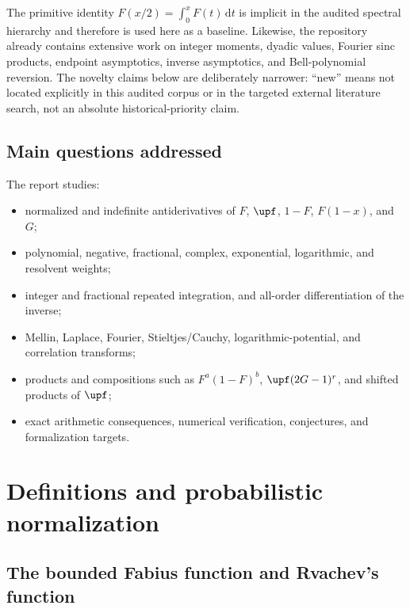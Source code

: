\documentclass[11pt,oneside]{article}
\theoremstyle{definition}
\theoremstyle{remark}
\newcommand{\dd}{\,\mathrm d}
\newcommand{\1}{\mathbf 1}
\begin{document}
The primitive identity $F(x/2)=\int_0^xF(t)\dd t$ is implicit in the audited spectral hierarchy and therefore is used here as a baseline.  Likewise, the repository already contains extensive work on integer moments, dyadic values, Fourier sinc products, endpoint asymptotics, inverse asymptotics, and Bell-polynomial reversion.  The novelty claims below are deliberately narrower: ``new'' means not located explicitly in this audited corpus or in the targeted external literature search, not an absolute historical-priority claim.

\subsection{Main questions addressed}

The report studies:
\begin{itemize}
\item normalized and indefinite antiderivatives of $F$, $\upf$, $1-F$, $F(1-x)$, and $G$;
\item polynomial, negative, fractional, complex, exponential, logarithmic, and resolvent weights;
\item integer and fractional repeated integration, and all-order differentiation of the inverse;
\item Mellin, Laplace, Fourier, Stieltjes/Cauchy, logarithmic-potential, and correlation transforms;
\item products and compositions such as $F^a(1-F)^b$, $\upf(2G-1)^r$, and shifted products of $\upf$;
\item exact arithmetic consequences, numerical verification, conjectures, and formalization targets.
\end{itemize}

\section{Definitions and probabilistic normalization}

\subsection{The bounded Fabius function and Rvachev's function}
\end{document}
